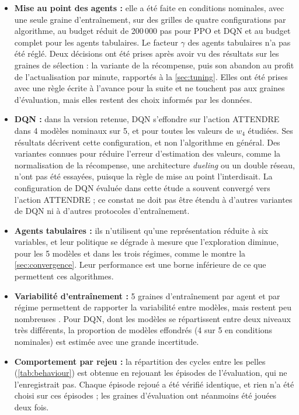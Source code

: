 \documentclass[11pt,a4paper]{article}
\newif\ifrevmarks
\newcommand{\revtag}[1]{\ifrevmarks\textsuperscript{\textcolor{red!70!black}{\scriptsize[#1]}}\fi}
\newenvironment{revbloc}[1]{\par\ifrevmarks\color{revcolor}\noindent\revtag{#1}\ \fi}{\par}
\newif\ifcorrmarks
\newcommand{\corr}[1]{\ifcorrmarks\textcolor{corrcolor}{#1}\else#1\fi}
\begin{document}
\begin{revbloc}{M7, M8, M9, M11, M12, M25, N1--N5, v3, T31}
\begin{itemize}
  \item \textbf{Mise au point des agents :} elle a été faite en conditions nominales, avec une seule graine d'entraînement, sur des grilles de quatre configurations par algorithme, au budget réduit de 200\,000 pas pour PPO et DQN et au budget complet pour les agents tabulaires. Le facteur $\gamma$ des agents tabulaires n'a pas été réglé. Deux décisions ont été prises après avoir vu des résultats sur les graines de sélection : la variante de la récompense, puis son abandon au profit de l'actualisation par minute, rapportés à la \cref{sec:tuning}. Elles ont été prises avec une règle écrite à l'avance pour la suite et ne touchent pas aux graines d'évaluation, mais elles restent des choix informés par les données.
  \item \textbf{DQN :} dans la version retenue, DQN s'effondre sur l'action ATTENDRE dans 4 modèles nominaux sur 5, et pour toutes les valeurs de $w_4$ étudiées. Ses résultats décrivent cette configuration, et non l'algorithme en général. Des variantes connues pour réduire l'erreur d'estimation des valeurs, comme la normalisation de la récompense, une architecture \emph{dueling} ou un double réseau, n'ont pas été essayées, puisque la règle de mise au point l'interdisait. \corr{La configuration de DQN évaluée dans cette étude a souvent convergé vers l'action ATTENDRE ; ce constat ne doit pas être étendu à d'autres variantes de DQN ni à d'autres protocoles d'entraînement.}
  \item \textbf{Agents tabulaires :} ils n'utilisent qu'une représentation réduite à six variables, et leur politique se dégrade à mesure que l'exploration diminue, pour les 5 modèles et dans les trois régimes, comme le montre la \cref{sec:convergence}. Leur performance est une borne inférieure de ce que permettent ces algorithmes.
  \item \textbf{Variabilité d'entraînement :} 5 graines d'entraînement par agent et par régime permettent de rapporter la variabilité entre modèles, mais restent peu nombreuses \cite{Henderson2018, Agarwal2021}. Pour DQN, dont les modèles se répartissent entre deux niveaux très différents, la proportion de modèles effondrés (4 sur 5 en conditions nominales) est estimée avec une grande incertitude.
  \item \textbf{Comportement par rejeu :} la répartition des cycles entre les pelles (\cref{tab:behaviour}) est obtenue en rejouant les épisodes de l'évaluation, qui ne l'enregistrait pas. Chaque épisode rejoué a été vérifié identique, et rien n'a été choisi sur ces épisodes ; les graines d'évaluation ont néanmoins été jouées deux fois.

\end{itemize}
\end{revbloc}
\end{document}
